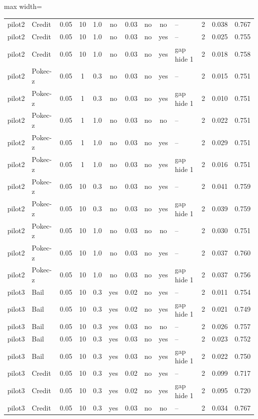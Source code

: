 \begin{table}[tbp]
\begin{adjustbox}{max width=\textwidth}
\begin{tabular}{llccccccclccc}
pilot2 & Credit & 0.05 & 10 & 1.0 & no & 0.03 & no & no & -- & 2 & 0.038 & 0.767 \\
pilot2 & Credit & 0.05 & 10 & 1.0 & no & 0.03 & no & yes & -- & 2 & 0.025 & 0.755 \\
pilot2 & Credit & 0.05 & 10 & 1.0 & no & 0.03 & no & yes & gap hide 1 & 2 & 0.018 & 0.758 \\
pilot2 & Pokec-z & 0.05 & 1 & 0.3 & no & 0.03 & no & yes & -- & 2 & 0.015 & 0.751 \\
pilot2 & Pokec-z & 0.05 & 1 & 0.3 & no & 0.03 & no & yes & gap hide 1 & 2 & 0.010 & 0.751 \\
pilot2 & Pokec-z & 0.05 & 1 & 1.0 & no & 0.03 & no & no & -- & 2 & 0.022 & 0.751 \\
pilot2 & Pokec-z & 0.05 & 1 & 1.0 & no & 0.03 & no & yes & -- & 2 & 0.029 & 0.751 \\
pilot2 & Pokec-z & 0.05 & 1 & 1.0 & no & 0.03 & no & yes & gap hide 1 & 2 & 0.016 & 0.751 \\
pilot2 & Pokec-z & 0.05 & 10 & 0.3 & no & 0.03 & no & yes & -- & 2 & 0.041 & 0.759 \\
pilot2 & Pokec-z & 0.05 & 10 & 0.3 & no & 0.03 & no & yes & gap hide 1 & 2 & 0.039 & 0.759 \\
pilot2 & Pokec-z & 0.05 & 10 & 1.0 & no & 0.03 & no & no & -- & 2 & 0.030 & 0.751 \\
pilot2 & Pokec-z & 0.05 & 10 & 1.0 & no & 0.03 & no & yes & -- & 2 & 0.037 & 0.760 \\
pilot2 & Pokec-z & 0.05 & 10 & 1.0 & no & 0.03 & no & yes & gap hide 1 & 2 & 0.037 & 0.756 \\
pilot3 & Bail & 0.05 & 10 & 0.3 & yes & 0.02 & no & yes & -- & 2 & 0.011 & 0.754 \\
pilot3 & Bail & 0.05 & 10 & 0.3 & yes & 0.02 & no & yes & gap hide 1 & 2 & 0.021 & 0.749 \\
pilot3 & Bail & 0.05 & 10 & 0.3 & yes & 0.03 & no & no & -- & 2 & 0.026 & 0.757 \\
pilot3 & Bail & 0.05 & 10 & 0.3 & yes & 0.03 & no & yes & -- & 2 & 0.023 & 0.752 \\
pilot3 & Bail & 0.05 & 10 & 0.3 & yes & 0.03 & no & yes & gap hide 1 & 2 & 0.022 & 0.750 \\
pilot3 & Credit & 0.05 & 10 & 0.3 & yes & 0.02 & no & yes & -- & 2 & 0.099 & 0.717 \\
pilot3 & Credit & 0.05 & 10 & 0.3 & yes & 0.02 & no & yes & gap hide 1 & 2 & 0.095 & 0.720 \\
pilot3 & Credit & 0.05 & 10 & 0.3 & yes & 0.03 & no & no & -- & 2 & 0.034 & 0.767 \\

\end{tabular}
\end{adjustbox}
\end{table}
